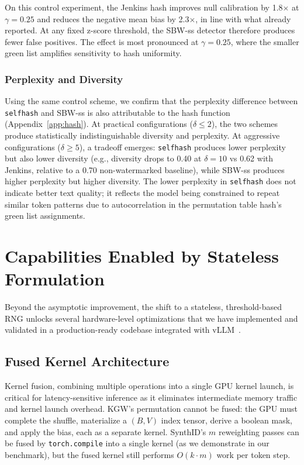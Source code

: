 \documentclass[11pt]{article}
\begin{document}
On this control experiment, the Jenkins hash improves null calibration by 1.8$\times$ at $\gamma=0.25$ and reduces the negative mean bias by 2.3$\times$, in line with what already reported. At any fixed z-score threshold, the SBW-ss detector therefore produces fewer false positives. The effect is most pronounced at $\gamma=0.25$, where the smaller green list amplifies sensitivity to hash uniformity.

\subsubsection{Perplexity and Diversity}
\label{sec:hash_diversity}

Using the same control scheme, we confirm that the perplexity difference between \texttt{selfhash} and SBW-ss is also attributable to the hash function (Appendix~\ref{app:hash}). At practical configurations ($\delta \leq 2$), the two schemes produce statistically indistinguishable diversity and perplexity. At aggressive configurations ($\delta \geq 5$), a tradeoff emerges: \texttt{selfhash} produces lower perplexity but also lower diversity (e.g., diversity drops to 0.40 at $\delta=10$ vs 0.62 with Jenkins, relative to a 0.70 non-watermarked baseline), while SBW-ss produces higher perplexity but higher diversity. The lower perplexity in \texttt{selfhash} does not indicate better text quality; it reflects the model being constrained to repeat similar token patterns due to autocorrelation in the permutation table hash's green list assignments.


\section{Capabilities Enabled by Stateless Formulation}
\label{sec:capabilities}

Beyond the asymptotic improvement, the shift to a stateless, threshold-based RNG unlocks several hardware-level optimizations that we have implemented and validated in a production-ready codebase integrated with vLLM~\cite{kwon2023efficient}.

\subsection{Fused Kernel Architecture}
\label{sec:fusion}

Kernel fusion, combining multiple operations into a single GPU kernel launch, is critical for latency-sensitive inference as it eliminates intermediate memory traffic and kernel launch overhead. KGW's permutation cannot be fused: the GPU must complete the shuffle, materialize a $(B, V)$ index tensor, derive a boolean mask, and apply the bias, each as a separate kernel. SynthID's $m$ reweighting passes can be fused by \texttt{torch.compile} into a single kernel (as we demonstrate in our benchmark), but the fused kernel still performs $O(k \cdot m)$ work per token step.
\end{document}
